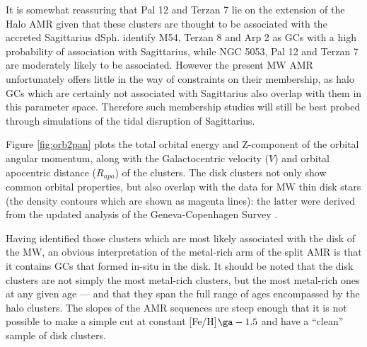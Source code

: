 \documentclass[useAMS,usenatbib]{mn2e}
\begin{document}
It is somewhat reassuring that Pal 12 and Terzan 7 lie on the extension of the Halo AMR 
given that these clusters are thought to be associated with the accreted Sagittarius dSph.
\cite{Law10} identify M54, Terzan 8 and Arp 2 as GCs with a high probability
of association with Sagittarius, while NGC 5053, Pal 12 and Terzan 7 are moderately likely to be
associated.  However the present MW AMR unfortunately offers little in the way of 
constraints on their membership, as halo GCs which are certainly not associated
with Sagittarius also overlap with them in this parameter space. 
Therefore such membership studies 
will still be best probed through simulations of the tidal disruption of 
Sagittarius.

Figure \ref{fig:orb2pan} plots the total orbital energy and Z-component of
the orbital angular momentum, along with the Galactocentric velocity ($V$) and
orbital apocentric distance ($R_{apo}$) of the clusters.  The disk clusters not
only show common orbital properties, but also overlap with the data for MW thin
disk stars (the density contours which are shown as magenta lines): the latter
were derived from the updated analysis \citep{Casagrande11} of the 
Geneva-Copenhagen Survey \citep{Nordstrom04}.

Having identified those clusters which are most likely associated with the disk
of the MW, an obvious interpretation of the metal-rich arm of the split AMR is that
it contains GCs that formed in-situ in the disk.  It should be noted that the
disk clusters are not simply the most metal-rich clusters, but the most
metal-rich ones at any given age --- and that they span the full range of ages
encompassed by the halo clusters.  The slopes of the AMR sequences are steep 
enough that it is not possible to make a simple cut 
at constant [Fe/H]$\ga -1.5$ and have a ``clean'' sample of disk clusters.
\end{document}
